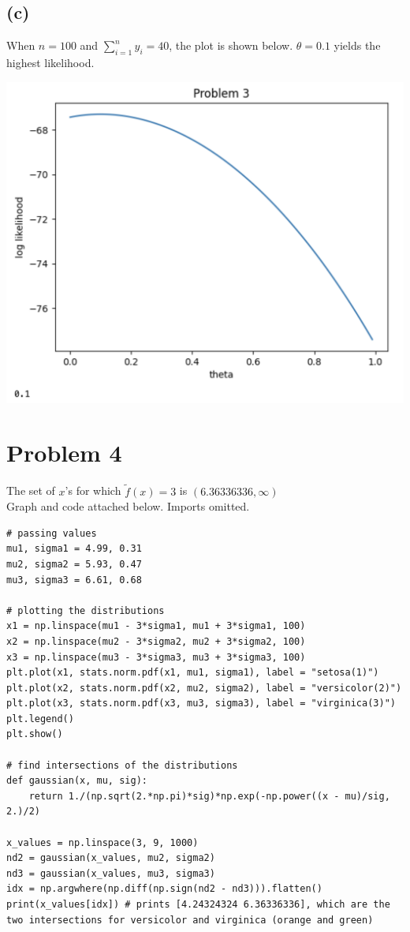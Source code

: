\documentclass[11pt]{article}
\begin{document}
\subsection{(c)}
When $n=100$ and $\sum_{i=1}^{n}y_i=40$, the plot is shown below. $\theta=0.1$ yields the highest likelihood. 
\begin{center}
    \includegraphics[scale=0.4]{images/p3theta.png}
\end{center}

\newpage
\section{Problem 4}
The set of $x$'s for which $\tilde{f}(x)=3$ is $(6.36336336,\infty)$ \\
Graph and code attached below. Imports omitted.
\begin{verbatim}
# passing values
mu1, sigma1 = 4.99, 0.31
mu2, sigma2 = 5.93, 0.47
mu3, sigma3 = 6.61, 0.68

# plotting the distributions
x1 = np.linspace(mu1 - 3*sigma1, mu1 + 3*sigma1, 100)
x2 = np.linspace(mu2 - 3*sigma2, mu2 + 3*sigma2, 100)
x3 = np.linspace(mu3 - 3*sigma3, mu3 + 3*sigma3, 100)
plt.plot(x1, stats.norm.pdf(x1, mu1, sigma1), label = "setosa(1)")
plt.plot(x2, stats.norm.pdf(x2, mu2, sigma2), label = "versicolor(2)")
plt.plot(x3, stats.norm.pdf(x3, mu3, sigma3), label = "virginica(3)")
plt.legend()
plt.show()

# find intersections of the distributions
def gaussian(x, mu, sig):
    return 1./(np.sqrt(2.*np.pi)*sig)*np.exp(-np.power((x - mu)/sig, 2.)/2)

x_values = np.linspace(3, 9, 1000)
nd2 = gaussian(x_values, mu2, sigma2)
nd3 = gaussian(x_values, mu3, sigma3)
idx = np.argwhere(np.diff(np.sign(nd2 - nd3))).flatten()
print(x_values[idx]) # prints [4.24324324 6.36336336], which are the two intersections for versicolor and virginica (orange and green)
\end{verbatim}
\end{document}
